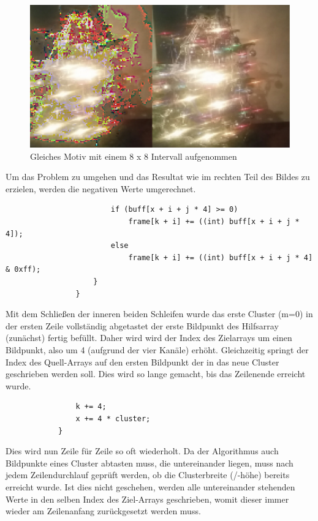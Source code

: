 \begin{description}
\begin{figure}[h]
	\centering
		\includegraphics[width=1.0\textwidth]{img/signedUnsigned.jpg}
	\caption[signedunsigned]{Gleiches Motiv mit einem 8 x 8 Intervall aufgenommen}
	\label{fig:signedunsigned}
\end{figure}
Um das Problem zu umgehen und das Resultat wie im rechten Teil des Bildes zu erzielen, werden die negativen Werte umgerechnet.
\begin{lstlisting}                    
                        if (buff[x + i + j * 4] >= 0)                                               
                            frame[k + i] += ((int) buff[x + i + j * 4]);                            
                        else
                            frame[k + i] += ((int) buff[x + i + j * 4] & 0xff);                     
                    }
                }
\end{lstlisting}
Mit dem Schließen der inneren beiden Schleifen wurde das erste Cluster (m=0) in der ersten Zeile vollständig abgetastet der erste Bildpunkt des Hilfsarray (zunächst) fertig befüllt. Daher wird wird der Index des Zielarrays um einen Bildpunkt, also um 4 (aufgrund der vier Kanäle) erhöht. Gleichzeitig springt der Index des Quell-Arrays auf den ersten Bildpunkt der in das neue Cluster geschrieben werden soll. Dies wird so lange gemacht, bis das Zeilenende erreicht wurde.
\begin{lstlisting}                 
                k += 4;                                                                             
                x += 4 * cluster;                                                                   
            }
\end{lstlisting}
Dies wird nun Zeile für Zeile so oft wiederholt. Da der Algorithmus auch Bildpunkte eines Cluster abtasten muss, die untereinander liegen, muss nach jedem Zeilendurchlauf geprüft werden, ob die Clusterbreite (/-höhe) bereits erreicht wurde. Ist dies nicht geschehen, werden alle untereinander stehenden Werte in den selben Index des Ziel-Arrays geschrieben, womit dieser immer wieder am Zeilenanfang zurückgesetzt werden muss.

\end{description}

